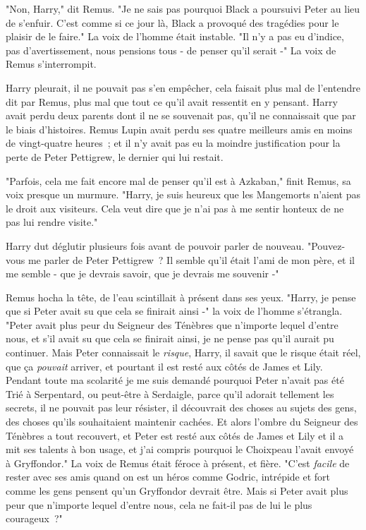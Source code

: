 \later

"Non, Harry," dit Remus. "Je ne sais pas pourquoi Black a poursuivi Peter au lieu de s'enfuir. C'est comme si ce jour là, Black a provoqué des tragédies pour le plaisir de le faire." La voix de l'homme était instable. "Il n'y a pas eu d'indice, pas d'avertissement, nous pensions tous - de penser qu'il serait -" La voix de Remus s'interrompit.

Harry pleurait, il ne pouvait pas s'en empêcher, cela faisait plus mal de l'entendre dit par Remus, plus mal que tout ce qu'il avait ressentit en y pensant. Harry avait perdu deux parents dont il ne se souvenait pas, qu'il ne connaissait que par le biais d'histoires. Remus Lupin avait perdu ses quatre meilleurs amis en moins de vingt-quatre heures~; et il n'y avait pas eu la moindre justification pour la perte de Peter Pettigrew, le dernier qui lui restait.

"Parfois, cela me fait encore mal de penser qu'il est à Azkaban," finit Remus, sa voix presque un murmure. "Harry, je suis heureux que les Mangemorts n'aient pas le droit aux visiteurs. Cela veut dire que je n'ai pas à me sentir honteux de ne pas lui rendre visite."

Harry dut déglutir plusieurs fois avant de pouvoir parler de nouveau. "Pouvez-vous me parler de Peter Pettigrew~? Il semble qu'il était l'ami de mon père, et il me semble - que je devrais savoir, que je devrais me souvenir -"

Remus hocha la tête, de l'eau scintillait à présent dans ses yeux. "Harry, je pense que si Peter avait su que cela se finirait ainsi -" la voix de l'homme s'étrangla. "Peter avait plus peur du Seigneur des Ténèbres que n'importe lequel d'entre nous, et s'il avait su que cela se finirait ainsi, je ne pense pas qu'il aurait pu continuer. Mais Peter connaissait le \emph{risque}, Harry, il savait que le risque était réel, que ça \emph{pouvait} arriver, et pourtant il est resté aux côtés de James et Lily. Pendant toute ma scolarité je me suis demandé pourquoi Peter n'avait pas été Trié à Serpentard, ou peut-être à Serdaigle, parce qu'il adorait tellement les secrets, il ne pouvait pas leur résister, il découvrait des choses au sujets des gens, des choses qu'ils souhaitaient maintenir cachées. Et alors l'ombre du Seigneur des Ténèbres a tout recouvert, et Peter est resté aux côtés de James et Lily et il a mit ses talents à bon usage, et j'ai compris pourquoi le Choixpeau l'avait envoyé à Gryffondor." La voix de Remus était féroce à présent, et fière. "C'est \emph{facile} de rester avec ses amis quand on est un héros comme Godric, intrépide et fort comme les gens pensent qu'un Gryffondor devrait être. Mais si Peter avait plus peur que n'importe lequel d'entre nous, cela ne fait-il pas de lui le plus courageux~?"


